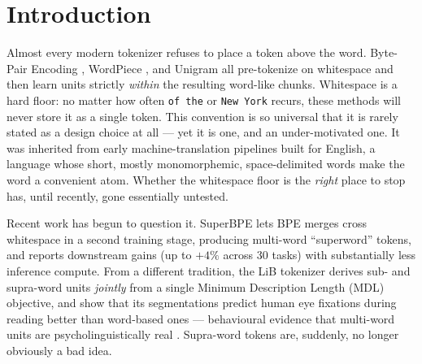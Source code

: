 
\newcommand{\TODO}[1]{\textcolor{todocolor}{[\textbf{TODO}: #1]}}

\section{Introduction}
\label{sec:intro}

Almost every modern tokenizer refuses to place a token above the word.
Byte-Pair Encoding \citep[BPE;][]{sennrich-etal-2016-neural}, WordPiece
\citep{schuster1999japanese,wu2016googles}, and Unigram
\citep{kudo-2018-subword} all pre-tokenize on whitespace and then learn units
strictly \emph{within} the resulting word-like chunks.  Whitespace is a hard
floor: no matter how often \texttt{of the} or \texttt{New York} recurs, these
methods will never store it as a single token.  This convention is so
universal that it is rarely stated as a design choice at all — yet it is one,
and an under-motivated one.  It was inherited from early machine-translation
pipelines built for English, a language whose short, mostly monomorphemic,
space-delimited words make the word a convenient atom.  Whether the whitespace
floor is the \emph{right} place to stop has, until recently, gone essentially
untested.

Recent work has begun to question it.  SuperBPE \citep{liu2025superbpe} lets BPE
merges cross whitespace in a second training stage, producing multi-word
``superword'' tokens, and reports downstream gains (up to $+4\%$ across 30
tasks) with substantially less inference compute.  From a different tradition,
the LiB tokenizer \citep{yang2020less,yang2024rethinking} derives sub- and
supra-word units \emph{jointly} from a single Minimum Description Length (MDL)
objective, and \citet{yang2022eyefixations} show that its segmentations predict
human eye fixations during reading better than word-based ones — behavioural
evidence that multi-word units are psycholinguistically real
\citep{wray2002formulaic,arnon2021starting}.  Supra-word tokens are, suddenly,
no longer obviously a bad idea.


